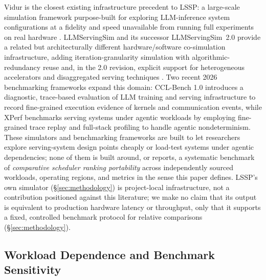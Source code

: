 Vidur is the closest existing infrastructure precedent to LSSP: a
large-scale simulation framework purpose-built for exploring LLM-inference
system configurations at a fidelity and speed unavailable from
running full experiments on real hardware \citep{vidur2024}. LLMServingSim
and its successor LLMServingSim~2.0 provide a related but architecturally
different hardware/software co-simulation infrastructure, adding
iteration-granularity simulation with algorithmic-redundancy reuse and,
in the 2.0 revision, explicit support for heterogeneous accelerators and
disaggregated serving techniques \citep{llmservingsim2024,llmservingsim2_2025}.
Two recent 2026 benchmarking frameworks expand this domain: CCL-Bench 1.0
\citep{ding2026cclbench} introduces a diagnostic, trace-based evaluation
of LLM training and serving infrastructure to record fine-grained execution
evidence of kernels and communication events, while XPerf \citep{wang2026xperf}
benchmarks serving systems under agentic workloads by employing fine-grained
trace replay and full-stack profiling to handle agentic nondeterminism.
These simulators and benchmarking frameworks are built to let researchers
explore serving-system design points cheaply or load-test systems under
agentic dependencies; none of them is built around, or reports, a systematic
benchmark of \emph{comparative scheduler ranking portability} across
independently sourced workloads, operating regions, and metrics in the sense
this paper defines. LSSP's own simulator (\S\ref{sec:methodology}) is
project-local infrastructure, not a contribution positioned against this
literature; we make no claim that its output is equivalent to production
hardware latency or throughput, only that it supports a fixed, controlled
benchmark protocol for relative comparisons (\S\ref{sec:methodology}).

\subsection{Workload Dependence and Benchmark Sensitivity}
\label{sec:related-dependence}

